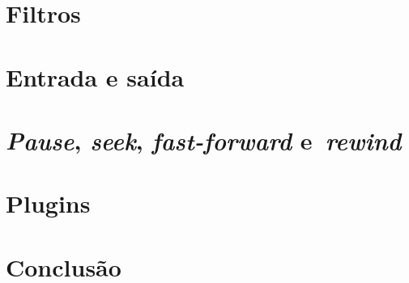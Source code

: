 \documentclass{SBCbookchapter}
\def\en#1{\foreignlanguage{english}{\emph{#1}}}
\begin{document}

\section{Filtros}
\label{sec:filtros}


\section{Entrada e saída}
\label{sec:e/s}


\section{\en{Pause}, \en{seek}, \en{fast-forward}
  e~\en{rewind}}
\label{sec:ops}


\section{Plugins}
\label{sec:plugins}


\section{Conclusão}
\label{sec:conclusao}




\end{document}
